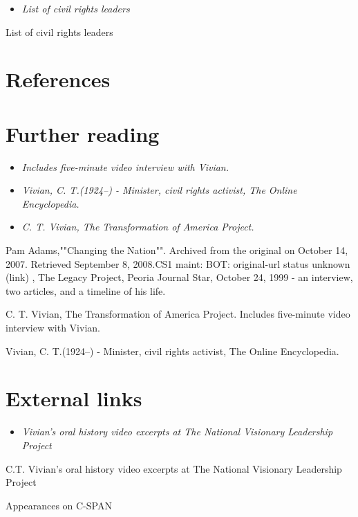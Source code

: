 \begin{itemize}
\item
  \emph{List of civil rights leaders}
\end{itemize}

List of civil rights leaders

\section{References}\label{references}

\section{Further reading}\label{further-reading}

\begin{itemize}
\item
  \emph{Includes five-minute video interview with Vivian.}
\item
  \emph{Vivian, C. T.(1924--) - Minister, civil rights activist, The
  Online Encyclopedia.}
\item
  \emph{C. T. Vivian, The Transformation of America Project.}
\end{itemize}

Pam Adams,""Changing the Nation"". Archived from the original on October
14, 2007. Retrieved September 8, 2008.CS1 maint: BOT: original-url
status unknown (link) , The Legacy Project, Peoria Journal Star, October
24, 1999 - an interview, two articles, and a timeline of his life.

C. T. Vivian, The Transformation of America Project. Includes
five-minute video interview with Vivian.

Vivian, C. T.(1924--) - Minister, civil rights activist, The Online
Encyclopedia.

\section{External links}\label{external-links}

\begin{itemize}
\item
  \emph{Vivian's oral history video excerpts at The National Visionary
  Leadership Project}
\end{itemize}

C.T. Vivian's oral history video excerpts at The National Visionary
Leadership Project

Appearances on C-SPAN
